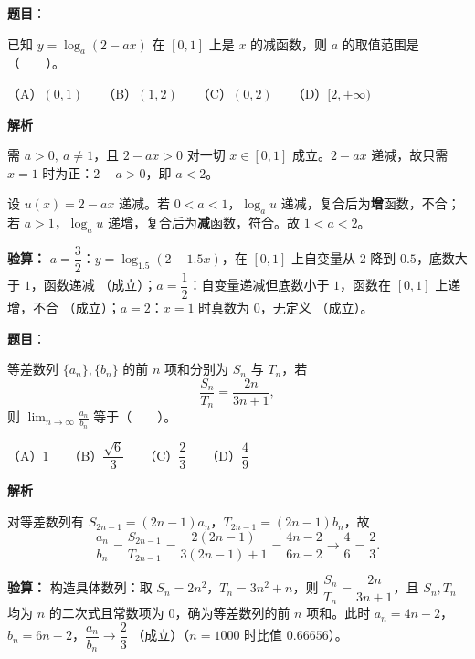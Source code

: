\begin{answer}

\textbf{题目}：

已知 $y=\log_a(2-ax)$ 在 $[0,1]$ 上是 $x$ 的减函数，则 $a$ 的取值范围是\mbox{（　　）}。

（A）$(0,1)$　　（B）$(1,2)$　　（C）$(0,2)$　　（D）$[2,+\infty)$

\textbf{解析}

需 $a>0,\ a\ne1$，且 $2-ax>0$ 对一切 $x\in[0,1]$ 成立。$2-ax$ 递减，故只需 $x=1$ 时为正：$2-a>0$，即 $a<2$。

设 $u(x)=2-ax$ 递减。若 $0<a<1$，$\log_a u$ 递减，复合后为\textbf{增}函数，不合；若 $a>1$，$\log_a u$ 递增，复合后为\textbf{减}函数，符合。故 $1<a<2$。

\textbf{验算：} $a=\dfrac32$：$y=\log_{1.5}(2-1.5x)$，在 $[0,1]$ 上自变量从 $2$ 降到 $0.5$，底数大于 $1$，函数递减 （成立）；$a=\dfrac12$：自变量递减但底数小于 $1$，函数在 $[0,1]$ 上递增，不合 （成立）；$a=2$：$x=1$ 时真数为 $0$，无定义 （成立）。


\par\medskip

\end{answer}
\begin{answer}

\textbf{题目}：

等差数列 $\{a_n\},\{b_n\}$ 的前 $n$ 项和分别为 $S_n$ 与 $T_n$，若
\nopagebreak[4]
\[
\frac{S_n}{T_n}=\frac{2n}{3n+1},
\]
则 $\displaystyle\lim_{n\to\infty}\frac{a_n}{b_n}$ 等于\mbox{（　　）}。

（A）$1$　　（B）$\dfrac{\sqrt6}{3}$　　（C）$\dfrac23$　　（D）$\dfrac49$

\textbf{解析}

对等差数列有 $S_{2n-1}=(2n-1)a_n$，$T_{2n-1}=(2n-1)b_n$，故
\nopagebreak[4]
\[\frac{a_n}{b_n}=\frac{S_{2n-1}}{T_{2n-1}}=\frac{2(2n-1)}{3(2n-1)+1}=\frac{4n-2}{6n-2}\longrightarrow\frac46=\frac23.\]

\textbf{验算：} 构造具体数列：取 $S_n=2n^2$，$T_n=3n^2+n$，则 $\dfrac{S_n}{T_n}=\dfrac{2n}{3n+1}$，且 $S_n,T_n$ 均为 $n$ 的二次式且常数项为 $0$，确为等差数列的前 $n$ 项和。此时 $a_n=4n-2$，$b_n=6n-2$，$\dfrac{a_n}{b_n}\to\dfrac23$ （成立）（$n=1000$ 时比值 $0.66656$）。


\par\medskip

\end{answer}
